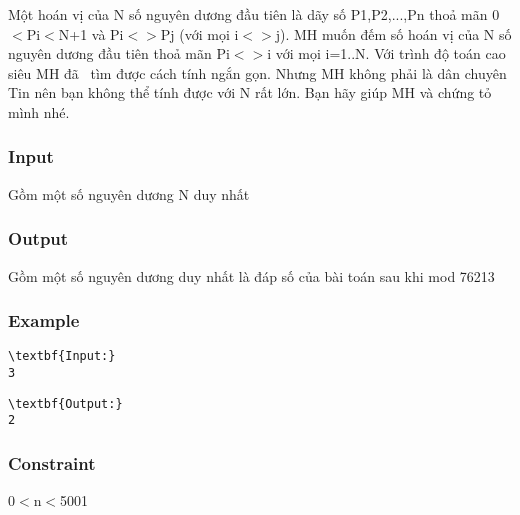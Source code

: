 



   Một hoán vị của N số nguyên dương đầu tiên là dãy số P1,P2,...,Pn thoả mãn 0$<$Pi$<$N+1 và Pi$<$$>$Pj (với mọi i$<$$>$j). MH muốn đếm số hoán vị của N số nguyên dương đầu tiên thoả mãn Pi$<$$>$i với mọi i=1..N. Với trình độ toán cao siêu MH đã  tìm được cách tính ngắn gọn. Nhưng MH không phải là dân chuyên Tin nên bạn không thể tính được với N rất lớn. Bạn hãy giúp MH và chứng tỏ mình nhé.  

\subsubsection{   Input  }

   Gồm một số nguyên dương N duy nhất  

\subsubsection{   Output  }

   Gồm một số nguyên dương duy nhất là đáp số của bài toán sau khi mod 76213  

\subsubsection{   Example  }
\begin{verbatim}
\textbf{Input:}
3\end{verbatim}
\begin{verbatim}
\textbf{Output:}
2
\end{verbatim}

\subsubsection{   Constraint  }

   0$<$n$<$5001  